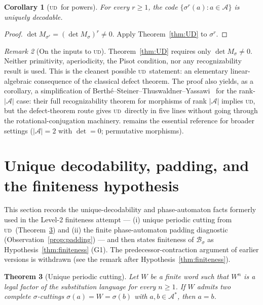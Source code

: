 \documentclass[11pt]{article}
\theoremstyle{plain}
\newtheorem{theorem}{Theorem}[section]
\newtheorem{corollary}[theorem]{Corollary}
\theoremstyle{definition}
\theoremstyle{remark}
\newtheorem{remark}[theorem]{Remark}
\newcommand{\UD}{\textsc{ud}}
\newcommand{\A}{\mathcal{A}}
\newcommand{\B}{\mathcal{B}}
\begin{document}
\begin{corollary}[\UD\ for powers]\label{cor:UD-powers}
For every $r\ge 1$, the code $\{\sigma^r(a):a\in\A\}$ is uniquely decodable.
\end{corollary}

\begin{proof}
$\det M_{\sigma^r}=(\det M_\sigma)^r\ne 0$. Apply Theorem~\ref{thm:UD} to $\sigma^r$.
\end{proof}

\begin{remark}[On the inputs to \UD]\label{rem:UD-inputs}
Theorem~\ref{thm:UD} requires only $\det M_\sigma\ne 0$. Neither primitivity, aperiodicity, the Pisot condition, nor any recognizability result is used. This is the cleanest possible \UD\ statement: an elementary linear-algebraic consequence of the classical defect theorem. The proof also yields, as a corollary, a simplification of Berth\'e--Steiner--Thuswaldner--Yassawi~\cite[Thm 3.1]{BSTY} for the rank-$|\A|$ case: their full recognizability theorem for morphisms of rank $|\A|$ implies \UD, but the defect-theorem route gives \UD\ directly in five lines without going through the rotational-conjugation machinery. \cite{BSTY} remains the essential reference for broader settings ($|\A|=2$ with $\det=0$; permutative morphisms).
\end{remark}

\section{Unique decodability, padding, and the finiteness hypothesis}\label{sec:finiteness}

This section records the unique-decodability and phase-automaton facts formerly used in the Level-2 finiteness attempt --- (i) unique periodic cutting from \UD\ (Theorem~\ref{thm:upc}) and (ii) the finite phase-automaton padding diagnostic (Observation~\ref{prop:padding}) --- and then states finiteness of $\B_\sigma$ as Hypothesis~\ref{thm:finiteness} (G1). The predecessor-contraction argument of earlier versions is withdrawn (see the remark after Hypothesis~\ref{thm:finiteness}).

\begin{theorem}[Unique periodic cutting]\label{thm:upc}
Let $W$ be a finite word such that $W^n$ is a legal factor of the substitution language for every $n\ge 1$. If $W$ admits two complete $\sigma$-cuttings $\sigma(a)=W=\sigma(b)$ with $a,b\in\A^*$, then $a=b$.
\end{theorem}
\end{document}

